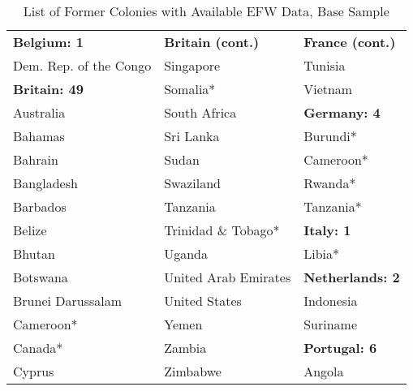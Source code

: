 \begin{table}[h!]
\centering
\begin{threeparttable}
\caption{List of Former Colonies with Available EFW Data, Base Sample}\label{tab:Tab2}
\begin{tabular*}{\textwidth}{@{\extracolsep{\fill}}lll@{\extracolsep{\fill}}}
\hline
\hline
            \textbf{Belgium: 1}     &              \textbf{Britain (cont.)} &               \textbf{France (cont.)} \\
            Dem. Rep. of the Congo	&	                       Singapore 	&	                         Tunisia 	\\
            \textbf{Britain: 49}	&	                         Somalia* 	&	                            Vietnam	\\
                        Australia 	&	                       South Africa	&	                \textbf{Germany: 4}	\\
                         Bahamas 	&	                       Sri Lanka 	&                         	Burundi*	\\
                         Bahrain 	&	                           Sudan 	&	                        Cameroon*	\\
                      Bangladesh 	&	                       Swaziland 	&	                            Rwanda*	\\
                        Barbados 	&	                        Tanzania 	&	                        Tanzania*	\\
                          Belize 	&	               Trinidad \& Tobago* 	&                 	\textbf{Italy: 1}	\\
                          Bhutan 	&	                          Uganda 	&	                            Libia* 	\\
                        Botswana 	&	            United Arab Emirates 	&	            \textbf{Netherlands: 2}	\\
               Brunei Darussalam 	&	                   United States 	&	                       Indonesia 	\\
                        Cameroon* 	&	                           Yemen 	&	                        Suriname 	\\
                          Canada* 	&	                          Zambia 	&	               \textbf{Portugal: 6}	\\
                          Cyprus 	&	                        Zimbabwe 	&	                            Angola 	\\

\end{tabular*}
\end{threeparttable}
\end{table}
